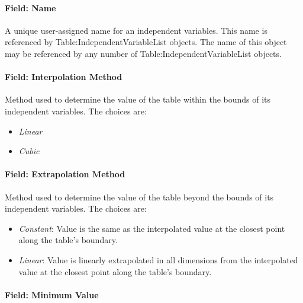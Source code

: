 \paragraph{Field: Name}\label{field-name-2}

A unique user-assigned name for an independent variables. This name is
referenced by Table:IndependentVariableList objects. The name of this
object may be referenced by any number of Table:IndependentVariableList
objects.

\paragraph{Field: Interpolation
Method}\label{field-interpolation-method}

Method used to determine the value of the table within the bounds of its
independent variables. The choices are:

\begin{itemize}
\tightlist
\item
\emph{Linear}
\item
\emph{Cubic}
\end{itemize}

\paragraph{Field: Extrapolation
Method}\label{field-extrapolation-method}

Method used to determine the value of the table beyond the bounds of its
independent variables. The choices are:

\begin{itemize}
\tightlist
\item
\emph{Constant}: Value is the same as the interpolated value at the
closest point along the table's boundary.
\item
\emph{Linear}: Value is linearly extrapolated in all dimensions from
the interpolated value at the closest point along the table's
boundary.
\end{itemize}

\paragraph{Field: Minimum Value}\label{field-minimum-value}

